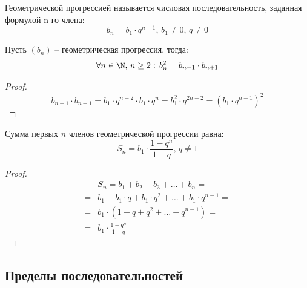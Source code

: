 \documentclass[12pt]{article}
\begin{document}
\begin{definition}
    Геометрической прогрессией называется числовая последовательность, заданная формулой n-го члена:
    $$b_n=b_1 \cdot q^{n-1},\, b_1\neq0,\, q\neq0$$
\end{definition}

\begin{statement}
    Пусть $(b_n)$ -- геометрическая прогрессия, тогда: 
    $$\forall n\in \N,\, n\geq 2:\,b_n^2=b_{n-1}\cdot b_{n+1}$$
\end{statement}
\begin{proof}
    $$b_{n-1}\cdot b_{n+1}=b_1\cdot q^{n-2}\cdot b_1 \cdot q^n=b_1^2\cdot q^{2n-2}=(b_1\cdot q^{n-1})^2$$
\end{proof}
\begin{theorem}
    Сумма первых $n$ членов геометрической прогрессии равна:
    $$S_n=b_1\cdot \frac{1-q^n}{1-q},\, q\neq 1$$
\end{theorem}
\begin{proof}
    \begin{align*}
        &S_n=b_1+b_2+b_3+\ldots+b_n=\\
        =&b_1+b_1\cdot q+b_1\cdot q^2+\ldots+b_1\cdot q^{n-1}=\\
        =&b_1\cdot(1+q+q^2+\ldots+q^{n-1})=\\
        =&b_1\cdot \frac{1-q^n}{1-q}
    \end{align*}
\end{proof}

\subsection{Пределы последовательностей}
\end{document}
